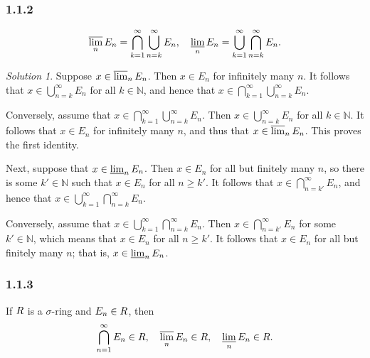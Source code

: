 \documentclass{report}
\newcommand{\bb}[1]{\mathbb{#1}}
\let\sc\relax
\newcommand{\sc}[1]{\mathscr{#1}}
\theoremstyle{remark}
\newtheorem*{solution}{Solution}
\begin{document}
\subsubsection{1.1.2}
\begin{equation*}
  \varlimsup_n E_n = \bigcap_{k=1}^\infty \bigcup_{n=k}^\infty E_n, \quad \varliminf_n E_n = \bigcup_{k=1}^\infty \bigcap_{n=k}^\infty E_n.
\end{equation*}

\begin{solution}
  Suppose $x \in \varlimsup_n E_n$. Then $x \in E_n$ for infinitely many $n$. It follows that $x \in \bigcup_{n=k}^\infty E_n$ for all $k \in \bb N$, and hence that $x \in \bigcap_{k=1}^\infty \bigcup_{n=k}^\infty E_n$.

  Conversely, assume that $x \in \bigcap_{k=1}^\infty \bigcup_{n=k}^\infty E_n$. Then $x \in \bigcup_{n=k}^\infty E_n$ for all $k \in \bb N$. It follows that $x \in E_n$ for infinitely many $n$, and thus that $x \in \varlimsup_n E_n$. This proves the first identity.

  Next, suppose that $x \in \varliminf_n E_n$. Then $x \in E_n$ for all but finitely many $n$, so there is some $k' \in \bb N$ such that $x \in E_n$ for all $n \ge k'$. It follows that $x \in \bigcap_{n=k'}^\infty E_n$, and hence that $x \in \bigcup_{k=1}^\infty \bigcap_{n=k}^\infty E_n$.

  Conversely, assume that $x \in \bigcup_{k=1}^\infty \bigcap_{n=k}^\infty E_n$. Then $x \in \bigcap_{n=k'}^\infty E_n$ for some $k' \in \bb N$, which means that $x \in E_n$ for all $n \ge k'$. It follows that $x \in E_n$ for all but finitely many $n$; that is, $x \in \varliminf_n E_n$.
\end{solution}

\subsubsection*{1.1.3}
If $\sc R$ is a $\sigma$-ring and $E_n \in \sc R$, then
\begin{equation*}
  \bigcap_{n=1}^\infty E_n \in \sc R, \quad \varlimsup_n E_n \in \sc R, \quad \varliminf_n E_n \in \sc R.
\end{equation*}
\end{document}
